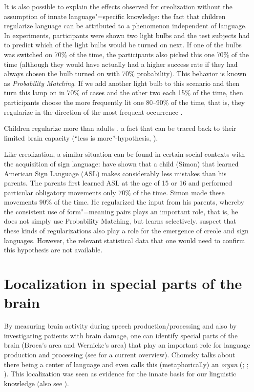 It is also possible to explain the effects observed for creolization without the assumption of innate language"=specific knowledge:
the fact that children regularize language can be attributed to a phenomenon independent of language. In experiments, participants were shown two
light bulbs and the test subjects had to predict which of the light bulbs would be turned on next. If one of the bulbs was switched on 70\% of the
time, the participants also picked this one 70\% of the time (although they would have actually had a higher success rate if they had always chosen
the bulb turned on with 70\% probability). This behavior is known as \emph{Probability Matching}. If we add another light bulb to this scenario and then turn this lamp on in 70\% of cases and the other two each 
15\% of the time, then participants choose the more frequently lit one 80--90\% of the time, that is, they regularize in the direction of
the most frequent occurrence \citep{Gardener57a,Weir64a}.

Children regularize more than adults \citep{HudsonN99a,HKN2005a}, a fact that can be traced back to their
limited brain capacity (``less is more''-hypothesis, \citealp{Newport90a,Elman93a}). 

Like creolization, a similar situation can be found in certain social contexts with the acquisition of sign language:
\citet{SN2004a} have shown that a child (Simon) that learned American Sign Language (ASL) makes considerably
less mistakes than his parents. The parents first learned ASL at the age of 15 or 16 and performed particular obligatory movements only
70\% of the time. Simon made these movements 90\% of the time. He regularized the input from his parents, whereby the consistent use
of form"=meaning pairs plays an important role, that is, he does not simply use Probability Matching, but learns selectively.
 \citet[]{SN2004a} suspect that these kinds of regularizations also play a role for the emergence of creole and sign languages.
However, the relevant statistical data that one would need to confirm this hypothesis are not available.


\section{Localization in special parts of the brain}

By measuring brain activity during speech production/processing and also by investigating patients with brain damage, one can identify
special parts of the brain (Broca's area and
Wernicke's area) that play an important role for language production and processing (see  for a current overview).
Chomsky talks about there being a center of language and even calls this (metaphorically) an
\emph{organ} (\citealp[]{Chomsky77c-u}; \citealp[]{Chomsky2005a}; \citealp[]{Chomsky2008a}).
This localization was seen as evidence for the innate basis for our linguistic knowledge (also see \citealp[--314]{Pinker94a}). 


